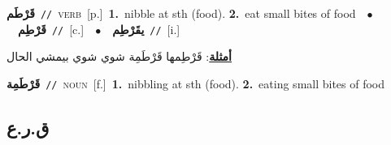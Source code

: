 \documentclass[10pt,a4paper,twoside]{article} %
\begin{document}
\begin{multicols}{2}
{\setlength\topsep{0pt}\textbf{\foreignlanguage{arabic}{قَرْطَم}}\ {\color{gray}\texttt{//}\color{black}}\ \textsc{verb}\ [p.]\ \textbf{1.}~nibble at sth (food).  \textbf{2.}~eat small bites of food\ \ $\bullet$\ \ \setlength\topsep{0pt}\textbf{\foreignlanguage{arabic}{قَرْطِم}}\ {\color{gray}\texttt{//}\color{black}}\ [c.]\ \ $\bullet$\ \ \setlength\topsep{0pt}\textbf{\foreignlanguage{arabic}{يقَرْطِم}}\ {\color{gray}\texttt{//}\color{black}}\ [i.]\  \begin{flushright}\color{gray}\foreignlanguage{arabic}{\textbf{\underline{\foreignlanguage{arabic}{أمثلة}}}: قَرْطِمها قَرْطَمِة شوي شوي بيمشي الحال}\end{flushright}\color{black}} \vspace{2mm}

{\setlength\topsep{0pt}\textbf{\foreignlanguage{arabic}{قَرْطَمِة}}\ {\color{gray}\texttt{//}\color{black}}\ \textsc{noun}\ [f.]\ \textbf{1.}~nibbling at sth (food).  \textbf{2.}~eating small bites of food\ } \vspace{2mm}

\vspace{-3mm}
\subsection*{\color{blue}\foreignlanguage{arabic}{ق.ر.ع}\color{blue}{}} 


\end{multicols}
\end{document}
